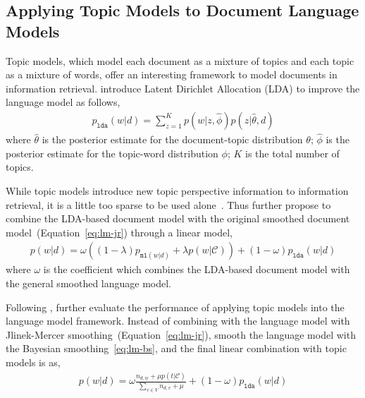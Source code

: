 
\subsection{Applying Topic Models to Document Language Models}

Topic models, which model each document as a mixture of topics and each topic as a mixture of words, offer an interesting framework to model documents in information retrieval. \cite{wei-06} introduce Latent Dirichlet Allocation (LDA) to improve the language model as follows,
\begin{align}
p_{\texttt{lda}}(w|d) = \sum_{z=1}^K p(w|z, \hat{\phi}) p(z | \hat{\theta}, d)
\end{align}
where $\hat{\theta}$ is the posterior estimate for the document-topic distribution $\theta$; $\hat{\phi}$ is the posterior estimate for the topic-word distribution $\phi$; $K$ is the total number of topics.

While topic models introduce new topic perspective information to information retrieval, it is a little too sparse to be used alone~\citep{wei-06}. Thus \cite{wei-06} further propose to combine the LDA-based document model with the original smoothed document model~(Equation~\ref{eq:lm-jr}) through a linear model,
\begin{align}
p(w|d) = \omega ((1 - \lambda) p_{\texttt{ml}(w|d)} + \lambda p(w|\mathcal{C})) + (1 - \omega) p_{\texttt{lda}}(w|d)
\end{align}
where $\omega$ is the coefficient which combines the LDA-based document model with the general smoothed language model.

Following \cite{wei-06}, \cite{Lu-2011} further evaluate the performance of applying topic models into the language model framework. Instead of combining with the language model with Jlinek-Mercer smoothing~(Equation~\ref{eq:lm-jr}), \cite{Lu-2011} smooth the language model with the Bayesian smoothing~\ref{eq:lm-bs}, and the final linear combination with topic models is as,
\begin{align}
p(w|d) = \omega \frac{n_{d,w} + \mu p(t|\mathcal{C})}{\sum_{v \in V} n_{d,v} + \mu}  + (1 - \omega) p_{\texttt{lda}}(w|d)
\end{align}





